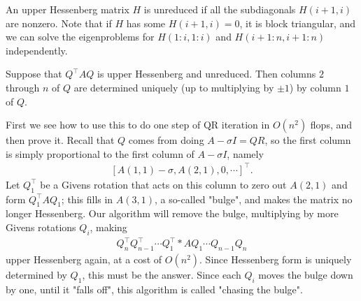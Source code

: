 \documentclass[11pt]{article}
\numberwithin{equation}{section}
\begin{document}
\begin{definition}
    An upper Hessenberg matrix $H$ is unreduced if all the subdiagonals $H(i+1,i)$ are nonzero. Note that if $H$ has some $H(i+1,i)=0$, 
    it is block triangular, and we can solve the eigenproblems for $H(1:i,1:i)$ and $H(i+1:n,i+1:n)$ independently.
\end{definition}

\begin{theorem}
    Suppose that $Q^{\top}AQ$ is upper Hessenberg and unreduced. Then columns $2$ through $n$ of $Q$ are determined uniquely (up to multiplying by $\pm 1$) 
    by column $1$ of $Q$. 
\end{theorem}
First we see how to use this to do one step of QR iteration in $O(n^2)$ flops, and then prove it. Recall that $Q$ comes from doing $A - \sigma I=QR$, 
so the first column is simply proportional to the first column of $A - \sigma I$, namely \begin{align*}
    \left[ A(1,1) - \sigma, A(2,1), 0, \cdots  \right]^{\top}.
\end{align*}
Let $Q_1^{\top}$ be a Givens rotation that acts on this column to zero out $A(2,1)$ and form $Q_1^{\top}AQ_1$; this fills in $A(3,1)$, a so-called "bulge", 
and makes the matrix no longer Hessenberg. Our algorithm will remove the bulge, multiplying by more Givens rotations $Q_i$, 
making \begin{align*}
    Q_n^{\top}Q_{n-1}^{\top}\cdots Q_1^{\top} * A Q_1 \cdots Q_{n-1} Q_n
\end{align*}
upper Hessenberg again, at a cost of $O(n^2)$. Since Hessenberg form is uniquely determined by $Q_1$, this must be the answer.
Since each $Q_i$ moves the bulge down by one, until it "falls off", this algorithm is called "chasing the bulge".
\end{document}
